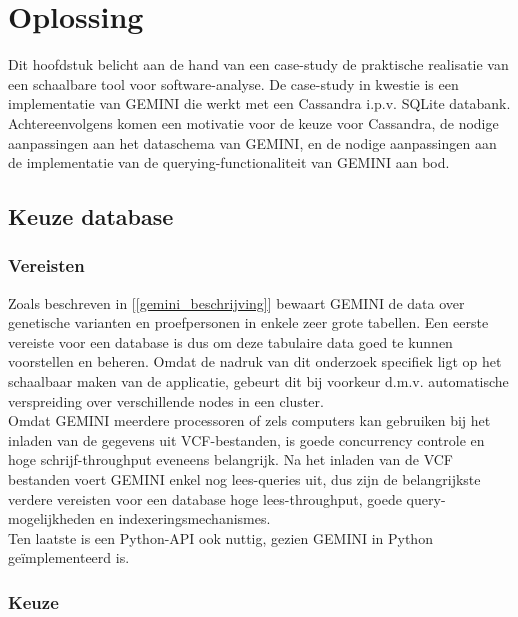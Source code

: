 \chapter{Oplossing}
\label{oplossing}

Dit hoofdstuk belicht aan de hand van een case-study de praktische realisatie van een schaalbare tool voor software-analyse. De case-study in kwestie is een implementatie van GEMINI die werkt met een Cassandra i.p.v. SQLite databank. Achtereenvolgens komen een motivatie voor de keuze voor Cassandra, de nodige aanpassingen aan het dataschema van GEMINI, en de nodige aanpassingen aan de implementatie van de querying-functionaliteit van GEMINI aan bod.

\section{Keuze database}

\subsection{Vereisten}

Zoals beschreven in [\ref{gemini_beschrijving}] bewaart GEMINI de data over genetische varianten en proefpersonen in enkele zeer grote tabellen. Een eerste vereiste voor een database is dus om deze tabulaire data goed te kunnen voorstellen en beheren. Omdat de nadruk van dit onderzoek specifiek ligt op het schaalbaar maken van de applicatie, gebeurt dit bij voorkeur d.m.v. automatische verspreiding over verschillende nodes in een cluster.\\
Omdat GEMINI meerdere processoren of zels computers kan gebruiken bij het inladen van de gegevens uit VCF-bestanden, is goede concurrency controle en hoge schrijf-throughput eveneens belangrijk. Na het inladen van de VCF bestanden voert GEMINI enkel nog lees-queries uit, dus zijn de belangrijkste verdere vereisten voor een database hoge lees-throughput, goede query-mogelijkheden en indexeringsmechanismes.
\\Ten laatste is een Python-API ook nuttig, gezien GEMINI in Python ge\"implementeerd is.

\subsection{Keuze}

